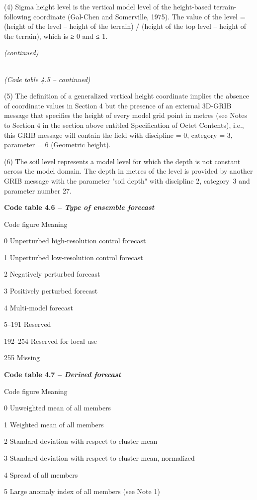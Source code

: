 (4) Sigma height level is the vertical model level of the height-based terrain-following coordinate (Gal-Chen and Somerville, 1975). The value of the level = (height of the level -- height of the terrain) / (height of the top level -- height of the terrain), which is ≥ 0 and ≤ 1.

\emph{(continued)}

\emph{\\
(Code table 4.5 -- continued)}

(5) The definition of a generalized vertical height coordinate implies the absence of coordinate values in Section 4 but the presence of an external 3D-GRIB message that specifies the height of every model grid point in metres (see Notes to Section 4 in the section above entitled Specification of Octet Contents), i.e., this GRIB message will contain the field with discipline = 0, category = 3, parameter = 6 (Geometric height).

(6) The soil level represents a model level for which the depth is not constant across the model domain. The depth in metres of the level is provided by another GRIB message with the parameter "soil depth" with discipline 2, category~3 and parameter number 27.

\textbf{Code table 4.6 -- \emph{Type of ensemble forecast}}

Code figure Meaning

0 Unperturbed high-resolution control forecast

1 Unperturbed low-resolution control forecast

2 Negatively perturbed forecast

3 Positively perturbed forecast

4 Multi-model forecast

5--191 Reserved

192--254 Reserved for local use

255 Missing

\textbf{Code table 4.7 -- \emph{Derived forecast}}

Code figure Meaning

0 Unweighted mean of all members

1 Weighted mean of all members

2 Standard deviation with respect to cluster mean

3 Standard deviation with respect to cluster mean, normalized

4 Spread of all members

5 Large anomaly index of all members (see Note 1)

